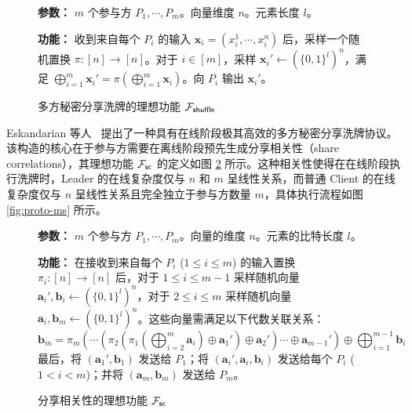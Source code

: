 \begin{figure}[!htb]
\begin{framed}
\begin{minipage}[c]{\textwidth}
\begin{trivlist}
\item \textbf{参数：} $m$ 个参与方 $P_1, \cdots, P_m$。向量维度 $n$。元素长度 $l$。
\item \textbf{功能：} 收到来自每个 $P_i$ 的输入 $\textbf{x}_i = {(x_i^1, \cdots, x_i^n)}$ 后，采样一个随机置换 $\pi : [n] \to [n]$。对于 $i \in [m]$，采样 $\textbf{x}_{i}' \gets (\{0,1\}^l)^n$，满足 $\bigoplus_{i=1}^m \textbf{x}_{i}' = \pi(\bigoplus_{i=1}^m \textbf{x}_i)$。向 $P_i$ 输出 $\textbf{x}_{i}'$。
\end{trivlist}
\end{minipage}
\end{framed}
\caption{多方秘密分享洗牌的理想功能 $\mathcal{F}_\mathsf{shuffle}$}\label{fig:func-ms}
\end{figure}

Eskandarian 等人~\cite{EB22} 提出了一种具有在线阶段极其高效的多方秘密分享洗牌协议。该构造的核心在于参与方需要在离线阶段预先生成分享相关性（share correlations），其理想功能 $\mathcal{F}_\mathsf{sc}$ 的定义如图 \ref{fig:func-sc} 所示。这种相关性使得在在线阶段执行洗牌时，Leader 的在线复杂度仅与 $n$ 和 $m$ 呈线性关系，而普通 Client 的在线复杂度仅与 $n$ 呈线性关系且完全独立于参与方数量 $m$，具体执行流程如图 \ref{fig:proto-ms} 所示。

\begin{figure}[!htb]
\begin{framed}
\begin{minipage}[c]{\textwidth}
\begin{trivlist}
\item \textbf{参数：} $m$ 个参与方 $P_1, \cdots, P_m$。向量的维度 $n$。元素的比特长度 $l$。
\item \textbf{功能：} 在接收到来自每个 $P_i$ ($1 \le i \le m$) 的输入置换 $\pi_i : [n] \to [n]$ 后，对于 $1 \le i \le m-1$ 采样随机向量 $\textbf{a}_i', \textbf{b}_i \gets (\{0,1\}^l)^n$，对于 $2 \le i \le m$ 采样随机向量 $\textbf{a}_i, \textbf{b}_m \gets (\{0,1\}^l)^n$。这些向量需满足以下代数关联关系：
\begin{equation*}
\textbf{b}_m = \pi_m(\cdots(\pi_2(\pi_1(\bigoplus_{i=2}^m \textbf{a}_i) \oplus \textbf{a}_1')\oplus \textbf{a}_2')\cdots \oplus \textbf{a}_{m-1}')\oplus \bigoplus_{i=1}^{m-1} \textbf{b}_i 
\end{equation*}
最后，将 $(\textbf{a}_1', \textbf{b}_1)$ 发送给 $P_1$；将 $(\textbf{a}_i', \textbf{a}_i, \textbf{b}_i)$ 发送给每个 $P_i$ ($1 < i < m$)；并将 $(\textbf{a}_m, \textbf{b}_m)$ 发送给 $P_m$。
\end{trivlist}
\end{minipage}
\end{framed}
\caption{分享相关性的理想功能 $\mathcal{F}_\mathsf{sc}$}\label{fig:func-sc}
\end{figure}

